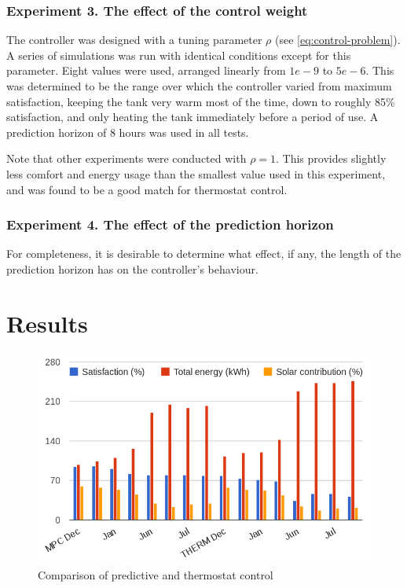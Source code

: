\subsubsection{Experiment 3. The effect of the control weight}

The controller was designed with a tuning parameter $\rho$ (see \autoref{eq:control-problem}).
A series of simulations was run with identical conditions except for this parameter.
Eight values were used, arranged linearly from $1e-9$ to $5e-6$.
This was determined to be the range over which the controller varied from maximum satisfaction, keeping the tank very warm most of the time, down to roughly 85\% satisfaction, and only heating the tank immediately before a period of use.
A prediction horizon of 8 hours was used in all tests.

Note that other experiments were conducted with $\rho = 1$.
This provides slightly less comfort and energy usage than the smallest value used in this experiment, and was found to be a good match for thermostat control.

\subsubsection{Experiment 4. The effect of the prediction horizon}

For completeness, it is desirable to determine what effect, if any, the length of the prediction horizon has on the controller's behaviour.

\section{Results}

\begin{figure}
	\centering
	\includegraphics[width=\textwidth]{images/comparison}
	\caption{Comparison of predictive and thermostat control}
	\label{fig:comparison}
\end{figure}

